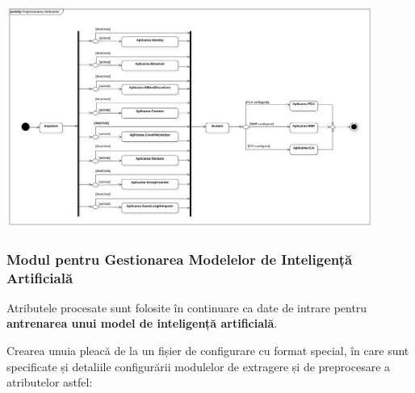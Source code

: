 \documentclass[../../main.tex]{subfiles}
\begin{document}
\begin{center}
    \includegraphics[width=12cm]{components/images/diagrams/activity_diagram_attribute_preprocessing.png}
    \label{fig:activity_diagram_attribute_preprocessing}
    \captionsetup{justification=centering,margin=1cm}
\end{center}
\vspace{0.3cm}

\subsubsection{Modul pentru Gestionarea Modelelor de Inteligență Artificială}

Atributele procesate sunt folosite în continuare ca date de intrare pentru \textbf{antre\-narea unui model de inteligență artificială}.

Crearea unuia pleacă de la un fișier de configurare cu format special, în care sunt specificate și detaliile configurării modulelor de extragere și de preprocesare a atributelor astfel:
\end{document}
